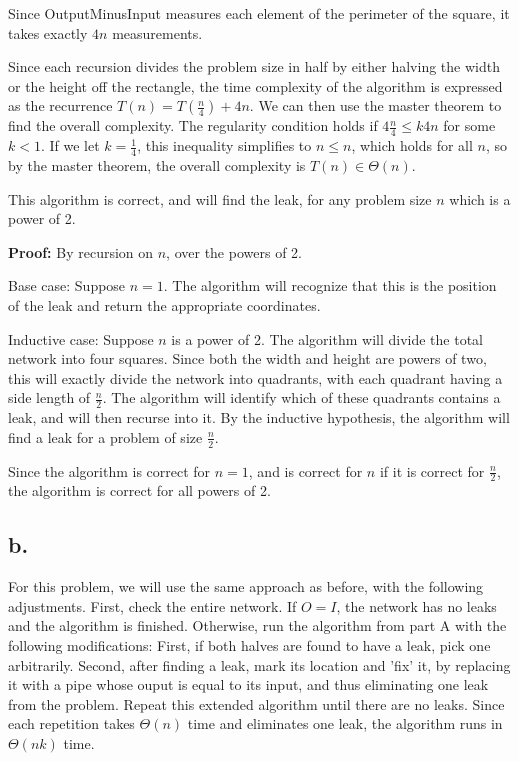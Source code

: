 \documentclass[11pt]{article}
\begin{document}
Since OutputMinusInput measures each element of the perimeter of the square, it takes exactly $4n$ measurements.


Since each recursion divides the problem size in half by either halving the width or the height off the rectangle, the time complexity of the algorithm is expressed as the recurrence $T(n) = T(\frac{n}{4}) + 4n$. We can then use the master theorem to find the overall complexity. The regularity condition holds if $4\frac{n}{4} \leq k4n$ for some $k < 1$. If we let $k = \frac{1}{4}$, this inequality simplifies to $n \leq n$, which holds for all $n$, so by the master theorem, the overall complexity is $T(n) \in \Theta(n)$.

This algorithm is correct, and will find the leak, for any problem size $n$ which is a power of 2.

\textbf{Proof: } By recursion on $n$, over the powers of 2. 

Base case: 
Suppose $n = 1$. The algorithm will recognize that this is the position of the leak and return the appropriate coordinates.

Inductive case:
Suppose $n$ is a power of 2. The algorithm will divide the total network into four squares. Since both the width and height are powers of two, this will exactly divide the network into quadrants, with each quadrant having a side length of $\frac{n}{2}$. The algorithm will identify which of these quadrants contains a leak, and will then recurse into it. By the inductive hypothesis, the algorithm will find a leak for a problem of size $\frac{n}{2}$.

Since the algorithm is correct for $n=1$, and is correct for $n$ if it is correct for $\frac{n}{2}$, the algorithm is correct for all powers of 2.


\subsection*{b.}

For this problem, we will use the same approach as before, with the following adjustments. First, check the entire network. If $O = I$, the network has no leaks and the algorithm is finished. Otherwise, run the algorithm from part A with the following modifications: First, if both halves are found to have a leak, pick one arbitrarily. Second, after finding a leak, mark its location and 'fix' it, by replacing it with a pipe whose ouput is equal to its input, and thus eliminating one leak from the problem. Repeat this extended algorithm until there are no leaks. Since each repetition takes $\Theta(n)$ time and eliminates one leak, the algorithm runs in $\Theta(nk)$ time.
\end{document}
